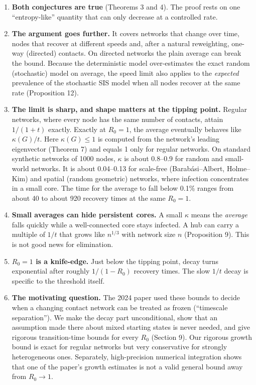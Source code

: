 \documentclass[
  11pt,
  a4paper,
]{article}
\providecommand{\tightlist}{%
  \setlength{\itemsep}{0pt}\setlength{\parskip}{0pt}}
\begin{document}
\begin{enumerate}
\def\labelenumi{\arabic{enumi}.}
\tightlist
\item
  \textbf{Both conjectures are true} (Theorems 3 and 4). The proof rests
  on one ``entropy-like'' quantity that can only decrease at a
  controlled rate.
\item
  \textbf{The argument goes further.} It covers networks that change
  over time, nodes that recover at different speeds and, after a natural
  reweighting, one-way (directed) contacts. On directed networks the
  plain average can break the bound. Because the deterministic model
  over-estimates the exact random (stochastic) model on average, the
  speed limit also applies to the \emph{expected} prevalence of the
  stochastic SIS model when all nodes recover at the same rate
  (Proposition 12).
\item
  \textbf{The limit is sharp, and shape matters at the tipping point.}
  Regular networks, where every node has the same number of contacts,
  attain \(1/(1+t)\) exactly. Exactly at \(R_0=1\), the average
  eventually behaves like \(\kappa(G)/t\). Here \(\kappa(G)\le1\) is
  computed from the network's leading eigenvector (Theorem 7) and equals
  1 only for regular networks. On standard synthetic networks of 1000
  nodes, \(\kappa\) is about 0.8--0.9 for random and small-world
  networks. It is about 0.04--0.13 for scale-free (Barabási--Albert,
  Holme--Kim) and spatial (random geometric) networks, where infection
  concentrates in a small core. The time for the average to fall below
  0.1\% ranges from about 40 to about 920 recovery times at the same
  \(R_0=1\).
\item
  \textbf{Small averages can hide persistent cores.} A small \(\kappa\)
  means the \emph{average} falls quickly while a well-connected core
  stays infected. A hub can carry a multiple of \(1/t\) that grows like
  \(n^{1/3}\) with network size \(n\) (Proposition 9). This is not good
  news for elimination.
\item
  \textbf{\(R_0=1\) is a knife-edge.} Just below the tipping point,
  decay turns exponential after roughly \(1/(1-R_0)\) recovery times.
  The slow \(1/t\) decay is specific to the threshold itself.
\item
  \textbf{The motivating question.} The 2024 paper used these bounds to
  decide when a changing contact network can be treated as frozen
  (``timescale separation''). We make the decay part unconditional, show
  that an assumption made there about mixed starting states is never
  needed, and give rigorous transition-time bounds for every \(R_0\)
  (Section 9). Our rigorous growth bound is exact for regular networks
  but very conservative for strongly heterogeneous ones. Separately,
  high-precision numerical integration shows that one of the paper's
  growth estimates is not a valid general bound away from \(R_0\to1\).
\end{enumerate}
\end{document}
